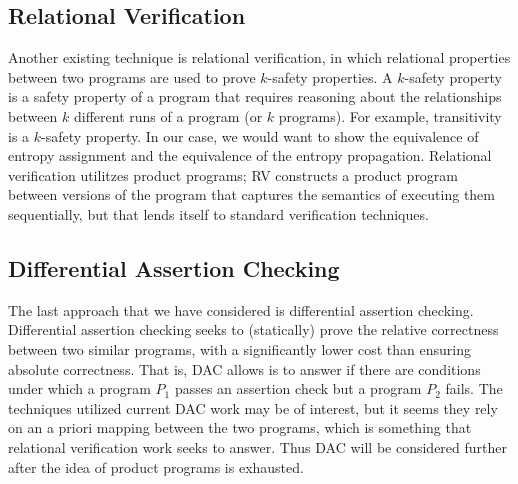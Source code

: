 \documentclass[letterpaper,twocolumn,10pt]{article}
\begin{document}
\subsection{Relational Verification}
Another existing technique is relational verification, in which relational properties between two programs are used to prove $k$-safety properties. A $k$-safety property is a safety property of a program that requires 
reasoning about the relationships between $k$ different runs of a program (or $k$ programs). For example, transitivity is a $k$-safety property.
In our case, we would want to show the equivalence of entropy assignment and the equivalence of the entropy propagation. Relational verification utilitzes product programs; RV constructs a product program between versions of the program that captures the semantics of executing them sequentially, but that lends itself to standard verification techniques. 

\subsection{Differential Assertion Checking}

The last approach that we have considered is differential assertion checking. Differential assertion checking seeks to (statically) prove the relative correctness between two similar programs,
with a significantly lower cost than ensuring absolute correctness. That is, DAC allows is to answer if there are conditions under which a program $P_1$ passes an assertion check but
a program $P_2$ fails. The techniques utilized current DAC work may be of interest, but it seems they rely on an a priori mapping between the two programs, which is something that
relational verification work seeks to answer. Thus DAC will be considered further after the idea of product programs is exhausted.




\end{document}
